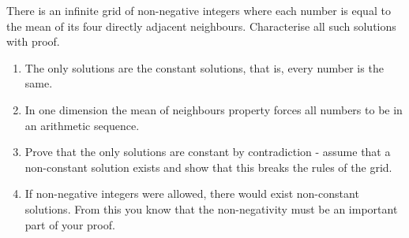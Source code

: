 \question

There is an infinite grid of non-negative integers where each number is equal to the mean of its four directly adjacent neighbours. Characterise all such solutions with proof.

\begin{hints}
	\begin{enumerate}
		\item The only solutions are the constant solutions, that is, every number is the same.
		\item In one dimension the mean of neighbours property forces all numbers to be in an arithmetic sequence.
		\item Prove that the only solutions are constant by contradiction - assume that a non-constant solution exists and show that this breaks the rules of the grid.
		\item If non-negative integers were allowed, there would exist non-constant solutions. From this you know that the non-negativity must be an important part of your proof.
	\end{enumerate}
\end{hints}

